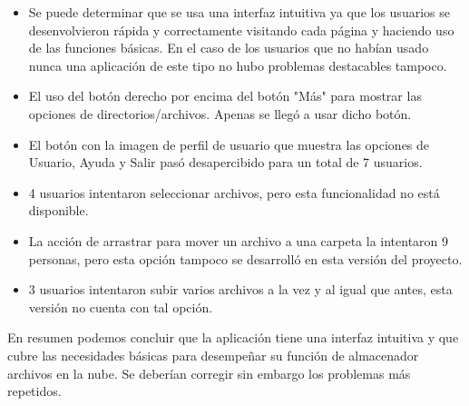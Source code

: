 \begin{itemize}{}
	\item Se puede determinar que se usa una interfaz intuitiva ya que los usuarios se desenvolvieron rápida y correctamente visitando cada página y haciendo uso de las funciones básicas. En el caso de los usuarios que no habían usado nunca una aplicación de este tipo no hubo problemas destacables tampoco.
	\item El uso del botón derecho por encima del botón "Más" para mostrar las opciones de directorios/archivos. Apenas se llegó a usar dicho botón.
	\item El botón con la imagen de perfil de usuario que muestra las opciones de Usuario, Ayuda y Salir pasó desapercibido para un total de 7 usuarios.
	\item 4 usuarios intentaron seleccionar archivos, pero esta funcionalidad no está disponible.
	\item La acción de arrastrar para mover un archivo a una carpeta la intentaron 9 personas, pero esta opción tampoco se desarrolló en esta versión del proyecto.
	\item 3 usuarios intentaron subir varios archivos a la vez y al igual que antes, esta versión no cuenta con tal opción.
\end{itemize}

En resumen podemos concluir que la aplicación tiene una interfaz intuitiva y que cubre las necesidades básicas para desempeñar su función de almacenador archivos en la nube. Se deberían corregir sin embargo los problemas más repetidos.